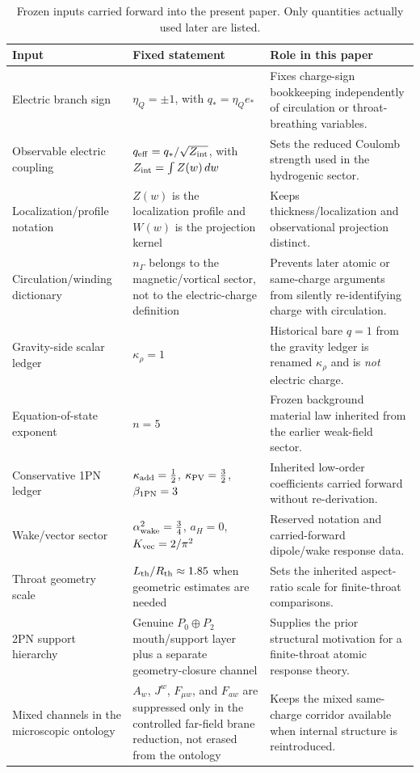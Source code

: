 \documentclass[11pt]{article}
\theoremstyle{plain}
\theoremstyle{definition}
\theoremstyle{remark}
\begin{document}
\begin{table}[t]
\centering
\caption{Frozen inputs carried forward into the present paper. Only quantities actually used later are listed.}
\label{tab:frozen-inputs}
\begin{tabularx}{\textwidth}{@{}>{\raggedright\arraybackslash}p{} >{\raggedright\arraybackslash}p{} X@{}}
\toprule
Input & Fixed statement & Role in this paper \\
\midrule
Electric branch sign & $\eta_Q=\pm1$, with $q_*=\eta_Q e_*$ & Fixes charge-sign bookkeeping independently of circulation or throat-breathing variables. \\
Observable electric coupling & $q_{\rm eff}=q_*/\sqrt{Z_{\rm int}}$, with $Z_{\rm int}=\int Z(w)\,dw$ & Sets the reduced Coulomb strength used in the hydrogenic sector. \\
Localization/profile notation & $Z(w)$ is the localization profile and $W(w)$ is the projection kernel & Keeps thickness/localization and observational projection distinct. \\
Circulation/winding dictionary & $n_\Gamma$ belongs to the magnetic/vortical sector, not to the electric-charge definition & Prevents later atomic or same-charge arguments from silently re-identifying charge with circulation. \\
Gravity-side scalar ledger & $\kappa_{\rho}=1$ & Historical bare $q=1$ from the gravity ledger is renamed $\kappa_{\rho}$ and is \emph{not} electric charge. \\
Equation-of-state exponent & $n=5$ & Frozen background material law inherited from the earlier weak-field sector. \\
Conservative 1PN ledger & $\kappa_{\rm add}=\tfrac12$, $\kappa_{\rm PV}=\tfrac32$, $\beta_{\rm 1PN}=3$ & Inherited low-order coefficients carried forward without re-derivation. \\
Wake/vector sector & $\alpha_{\rm wake}^2=\tfrac34$, $a_H=0$, $K_{\rm vec}=2/\pi^2$ & Reserved notation and carried-forward dipole/wake response data. \\
Throat geometry scale & $L_{\rm th}/R_{\rm th}\approx 1.85$ when geometric estimates are needed & Sets the inherited aspect-ratio scale for finite-throat comparisons. \\
2PN support hierarchy & Genuine $P_0\oplus P_2$ mouth/support layer plus a separate geometry-closure channel & Supplies the prior structural motivation for a finite-throat atomic response theory. \\
Mixed channels in the microscopic ontology & $A_w$, $J^w$, $F_{\mu w}$, and $F_{aw}$ are suppressed only in the controlled far-field brane reduction, not erased from the ontology & Keeps the mixed same-charge corridor available when internal structure is reintroduced. \\
\bottomrule
\end{tabularx}
\end{table}
\end{document}
